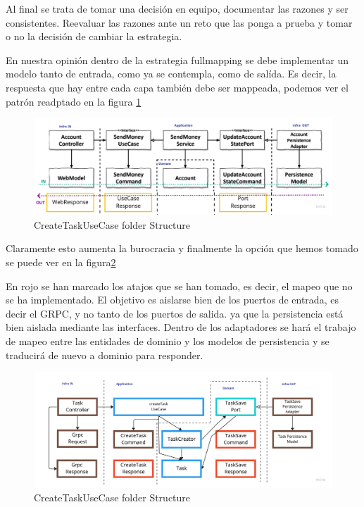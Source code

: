 Al final se trata de tomar una decisión en equipo, documentar las razones y ser consistentes. Reevaluar las razones ante un reto que las ponga a prueba y tomar o no la decisión de cambiar la estrategia.

En nuestra opinión dentro de la estrategia fullmapping se debe implementar un modelo tanto de entrada, como ya se contempla, como de salída. Es decir, la respuesta que hay entre cada capa también debe ser mappeada, podemos ver el patrón readptado en la figura \ref{fig:GetHandMapping}

\begin{figure}[H]
    \centering
    \includegraphics[height=0.2\textheight]{./part/Ejecucion/Seguimiento/CreateTaskUseCase/img/PFM - GetHandMapping}
    \caption{CreateTaskUseCase folder Structure\cite{TomHombergs2019GYHD}}\label{fig:GetHandMapping}
\end{figure}

Claramente esto aumenta la burocracia y finalmente la opción que hemos tomado se puede ver en la figura\ref{fig:CreateTaskUseCaseMapping}

En rojo se han marcado los atajos que se han tomado, es decir, el mapeo que no se ha implementado. El objetivo es aislarse bien de los puertos de entrada, es decir el GRPC, y no tanto de los puertos de salida. ya que la persistencia está bien aislada mediante las interfaces. Dentro de los adaptadores se hará el trabajo de mapeo entre las entidades de dominio y los modelos de persistencia y se traducirá de nuevo a dominio para responder.

\begin{figure}[H]
    \centering
    \includegraphics[height=0.2\textheight]{./part/Ejecucion/Seguimiento/CreateTaskUseCase/img/PFM - FinalMapping}
    \caption{CreateTaskUseCase folder Structure}\label{fig:CreateTaskUseCaseMapping}
\end{figure}

